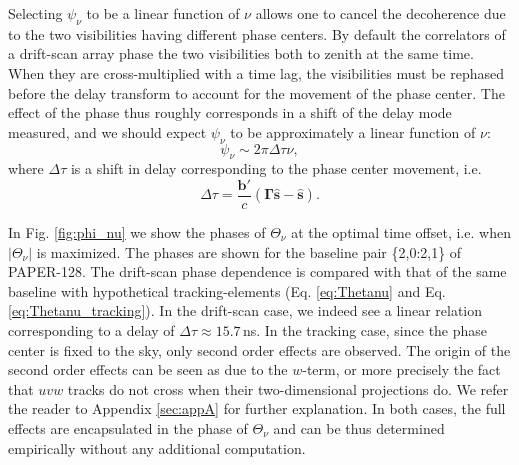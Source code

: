 \documentclass[twocolumn,apj,numberedappendix]{emulateapj}
\renewcommand\[{\begin{equation}}
\renewcommand\]{\end{equation}}
\begin{document}
Selecting $\psi_\nu$ to be a linear function of $\nu$ allows one to cancel
the decoherence due to the two visibilities having different phase centers. By default the correlators of a drift-scan array phase the two visibilities both to zenith at the same time. When they are cross-multiplied with a time lag, the visibilities must be rephased before the delay transform to account for the movement of the phase center. The effect of the phase thus roughly corresponds in a shift of the delay mode measured, and we should expect $\psi_{\nu}$ to be approximately a linear function of $\nu$:
\[
\psi_{\nu}\sim 2\pi\Delta\tau\nu,
\]
where $\Delta\tau$ is a shift in delay corresponding to the phase center movement, i.e.
\[
\Delta \tau = \frac{\boldsymbol{b'}}{c}\left(\boldsymbol{\Gamma}\hat{\boldsymbol{s}}-\hat{\boldsymbol{s}}\right). 
\]

In Fig. \ref{fig:phi_nu} we show the phases of $\Theta_\nu$ at the optimal time offset, i.e. when $|\Theta_\nu|$ is maximized. The phases are shown for the baseline pair \{2,0:2,1\} of PAPER-128. The drift-scan phase dependence is compared with that of the same baseline with hypothetical tracking-elements (Eq. \eqref{eq:Thetanu} and Eq. \eqref{eq:Thetanu_tracking}). In the drift-scan case, we indeed see a linear relation corresponding to a delay of $\Delta\tau\approx15.7$\,ns.  In the tracking case, since the phase center is fixed to the sky, only second order effects are observed. The origin of the second order effects can be seen as due to the $w$-term, or more precisely the fact that $uvw$ tracks do not cross when their two-dimensional projections do. We refer the reader to Appendix \ref{sec:appA} for further explanation. In both cases, the full effects are encapsulated in the phase of $\Theta_\nu$ and can be thus determined empirically without any additional computation. 
\end{document}
